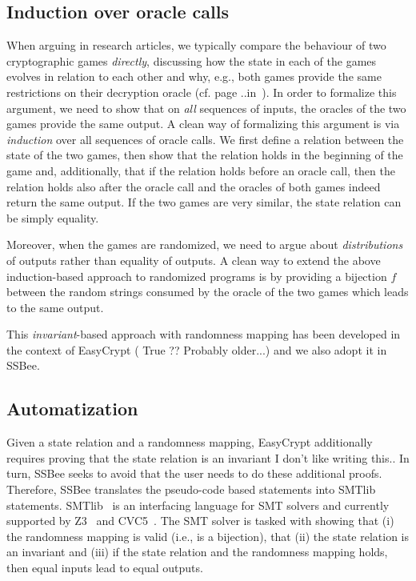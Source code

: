 {\subsection{Induction over oracle calls}
When arguing in research articles, we typically compare the behaviour of
two cryptographic games \emph{directly}, discussing how the state in each
of the games evolves in relation to each other and why, e.g., both games
provide the same restrictions on their decryption oracle (cf. page ..in~\cite{X}).
In order to formalize this argument, we need to show that on \emph{all} sequences of inputs, the oracles of the two games provide the same output. A clean way of formalizing this argument is via \emph{induction} over all sequences of oracle calls. We first define a relation between the state of the two games, then show that the relation holds in the beginning of the game and, additionally, that if the relation holds before an oracle call, then the relation holds also after the oracle call and the oracles of both games indeed return the same output. If the two games are very similar, the state relation can be simply equality.

Moreover, when the games are randomized, we need to argue about \emph{distributions}
of outputs rather than equality of outputs. A clean way to extend the above induction-based approach to randomized programs is by providing a bijection $f$ between
the random strings consumed by the oracle of the two games which leads to the
same output.

This \emph{invariant}-based approach with randomness mapping has been developed in the context of EasyCrypt {(\color{blue} True ?? Probably older...)} and we also adopt it in SSBee.

\subsection{Automatization}
Given a state relation and a randomness mapping, EasyCrypt additionally requires
proving that the state relation is an invariant {\color{blue} I don't like writing this.}. In turn, SSBee seeks to avoid that the user needs to do these additional proofs. Therefore, SSBee translates the pseudo-code based statements into SMTlib statements. SMTlib~\cite{X} is an interfacing language for SMT solvers and currently supported by Z3~\cite{X} and CVC5~\cite{X}. The SMT solver is tasked with showing that (i) the randomness mapping is valid (i.e., is a bijection), that (ii) the state relation is an invariant and (iii) if the state relation and the randomness mapping holds, then equal inputs lead to equal outputs.

}
